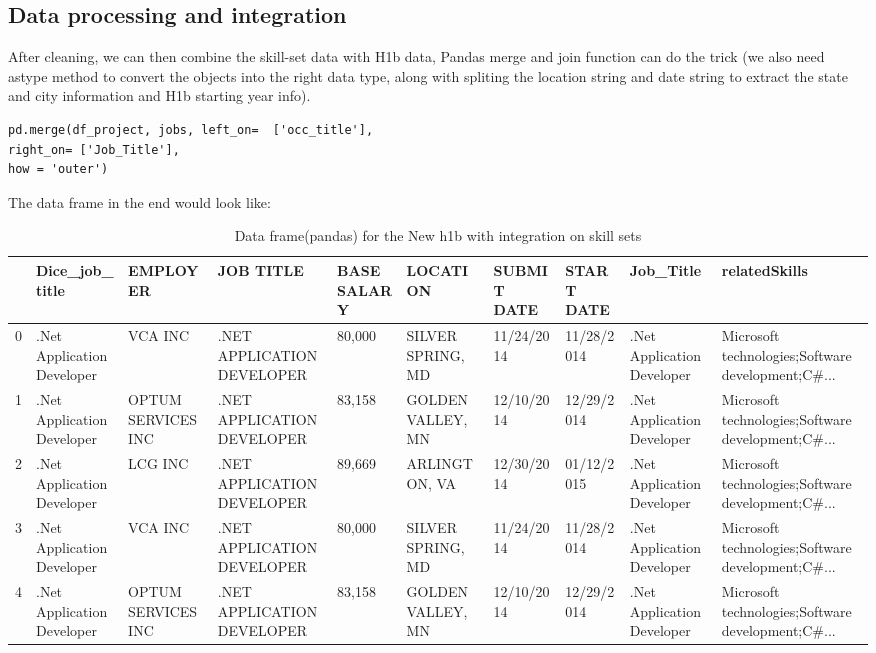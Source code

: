 \subsection{Data processing and integration}
After cleaning, we can then combine the skill-set data with H1b data, Pandas merge and join function can do the trick (we also need astype method to convert the objects into the right data type, along with spliting the location string and date string to extract the state and city information and H1b starting year info).
\begin{verbatim}
pd.merge(df_project, jobs, left_on=  ['occ_title'],
right_on= ['Job_Title'], 
how = 'outer')
\end{verbatim}
The data frame in the end would look like:
\begin{table}[h!]
	\caption{Data frame(pandas) for the New h1b with integration on skill sets}
	\resizebox{\columnwidth}{!}
	{%
\begin{tabular}{llllllllll}
	\hline
	{} &              Dice\_job\_title &                                           EMPLOYER &                   JOB TITLE & BASE SALARY &            LOCATION & SUBMIT DATE &  START DATE &                   Job\_Title &                                      relatedSkills \\
	\hline
	0  &  .Net Application Developer &                                            VCA INC &  .NET APPLICATION DEVELOPER &      80,000 &   SILVER SPRING, MD &  11/24/2014 &  11/28/2014 &  .Net Application Developer &  Microsoft technologies;Software development;C\#... \\
	1  &  .Net Application Developer &                                 OPTUM SERVICES INC &  .NET APPLICATION DEVELOPER &      83,158 &   GOLDEN VALLEY, MN &  12/10/2014 &  12/29/2014 &  .Net Application Developer &  Microsoft technologies;Software development;C\#... \\
	2  &  .Net Application Developer &                                            LCG INC &  .NET APPLICATION DEVELOPER &      89,669 &       ARLINGTON, VA &  12/30/2014 &  01/12/2015 &  .Net Application Developer &  Microsoft technologies;Software development;C\#... \\
	3  &  .Net Application Developer &                                            VCA INC &  .NET APPLICATION DEVELOPER &      80,000 &   SILVER SPRING, MD &  11/24/2014 &  11/28/2014 &  .Net Application Developer &  Microsoft technologies;Software development;C\#... \\
	4  &  .Net Application Developer &                                 OPTUM SERVICES INC &  .NET APPLICATION DEVELOPER &      83,158 &   GOLDEN VALLEY, MN &  12/10/2014 &  12/29/2014 &  .Net Application Developer &  Microsoft technologies;Software development;C\#... \\

\end{tabular}}
\end{table}
